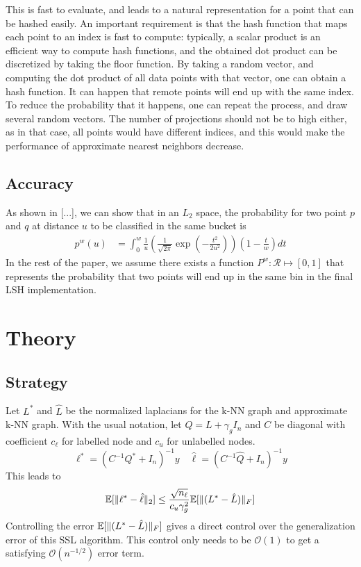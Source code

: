 \documentclass{article} %
\begin{document}
This is fast to evaluate, and leads to a natural representation for a point that can be hashed easily.  An important requirement is that the hash function that maps each point to an index is fast to compute: typically, a scalar product is an efficient way to compute hash functions, and the obtained dot product can be discretized by taking the floor function. By taking a random vector, and computing the dot product of all data points with that vector, one can obtain a hash function. It can happen that remote points will end up with the same index. To reduce the probability that it happens, one can repeat the process, and draw several random vectors. The number of projections should not be to high either, as in that case, all points would have different indices, and this would make the performance of approximate nearest neighbors decrease.

\subsection{Accuracy}
As shown in [...], we can show that in an $L_2$ space, the probability for two point $p$ and $q$ at distance $u$ to be classified in the same bucket is 
\begin{align*}
  p^w(u) &= \int_0^w \frac{1}{u}\left( \frac{1}{\sqrt{2\pi}}\exp(-\frac{t^2}{2u^2})\right)\left(1-\frac{t}{w}\right)dt
\end{align*}
In the rest of the paper, we assume there exists a function $P^w:\mathcal{R}\mapsto [0,1]$ that represents the probability that two points will end up in the same bin in the final LSH implementation.

\section{Theory}
\subsection{Strategy}
Let $L^*$ and $\hat{L}$ be the normalized laplacians for the k-NN graph and approximate k-NN graph. With the usual notation, let $Q = L+\gamma_gI_n$ and $C$ be diagonal with coefficient $c_\ell$ for labelled node and $c_u$ for unlabelled nodes.
$$\ell^* = (C^{-1}Q^* + I_n)^{-1}y \quad \hat{\ell} = (C^{-1}\hat{Q} + I_n)^{-1}y$$
This leads to 
$$ \mathbb{E}[\Arrowvert\ell^*-\hat{\ell}\Arrowvert_2] \leq \frac{\sqrt{n_\ell}}{c_u\gamma_g^2}\mathbb{E}[\Arrowvert(L^*-\hat{L})\Arrowvert_F]$$
Controlling the error $\mathbb{E}[\Arrowvert(L^*-\hat{L})\Arrowvert_F]$ gives a direct control over the generalization error of this SSL algorithm. This control only needs to be $\mathcal{O}(1)$ to get a satisfying $\mathcal{O}(n^{-1/2})$ error term.
\end{document}
